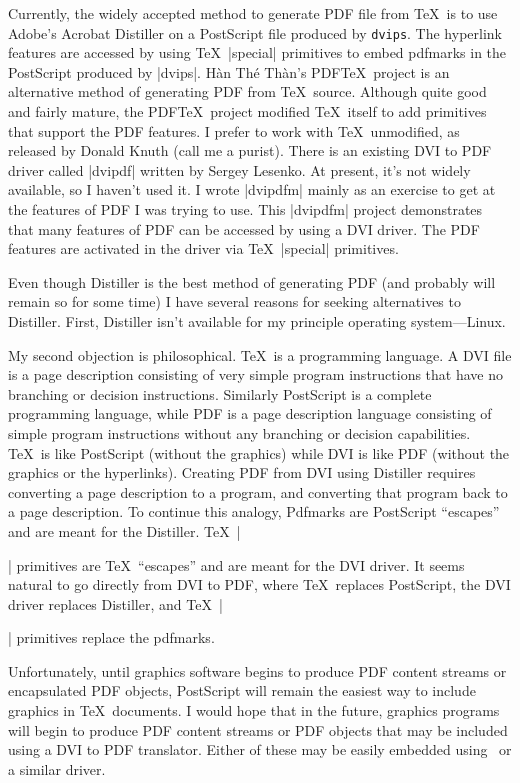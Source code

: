 {Currently, the widely accepted method to generate PDF file from \TeX\
is to use Adobe's Acrobat Distiller on a PostScript
file produced by {\tt dvips}.
The hyperlink features are accessed by using \TeX\ |special| primitives
to embed pdfmarks in the PostScript produced by |dvips|.
H\`an Th\'e Th\`an's PDF\TeX\ project is an alternative method
of generating PDF from \TeX\ source.
Although quite good and fairly mature, the PDF\TeX\ project
modified \TeX\ itself to add primitives that support the PDF features.
I prefer to work with \TeX\ unmodified, as released by Donald Knuth
(call me a purist).
There is an existing DVI to PDF driver called
|dvipdf| written by Sergey Lesenko.  At present, it's not widely
available, so I haven't used it.  I wrote |dvipdfm|
mainly as an exercise to get at the features
of PDF I was trying to use.  This |dvipdfm| project demonstrates that many features
of PDF can be accessed by using a DVI driver.
The PDF features are activated in the driver via
\TeX\ |special| primitives.

Even though Distiller is the best method of generating PDF (and
probably will remain so for some time) I have several reasons for
seeking alternatives to Distiller.
First, Distiller isn't available for my principle operating
system---Linux.

My second objection is philosophical.
\TeX\ is a programming language.
A DVI file is a page description consisting of very
simple program instructions that have no branching or
decision instructions.
Similarly PostScript is a complete programming language,
while PDF is a page description language consisting
of simple program instructions
without any branching or decision capabilities.
\TeX\ is like PostScript (without the graphics)
while DVI is like PDF (without the graphics or the hyperlinks).
Creating PDF from DVI using Distiller requires converting a page description to a program,
and converting that program back to a page description.
To continue this analogy,
Pdfmarks are PostScript ``escapes'' and are meant for the Distiller.
\TeX\ |\special| primitives are \TeX\ ``escapes'' and are meant for the DVI driver.
It seems natural to go directly from DVI to PDF, where \TeX\ replaces
PostScript, the DVI driver replaces Distiller,
and \TeX\ |\special| primitives replace the pdfmarks.

Unfortunately, until graphics software
begins to produce PDF content streams or encapsulated
PDF objects, PostScript will remain the easiest
way to include graphics in \TeX\ documents.
I would hope that in the future, graphics programs
will begin to produce PDF content streams or PDF objects that
may be included using a DVI to PDF translator.  Either
of these may be easily embedded using \dvipdfm\ or a similar driver.

}
